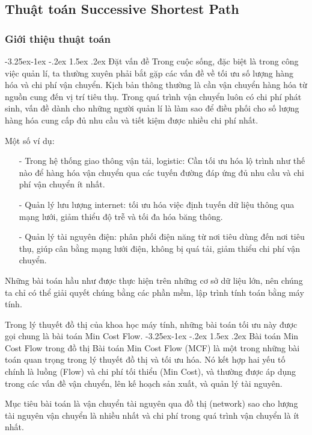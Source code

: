 \documentclass[a4paper]{article}
\makeatletter
\newcounter {subsubsubsection}[subsubsection]
\newcommand\subsubsubsection{\@startsection{subsubsubsection}{4}{\z@}%
                                     {-3.25ex\@plus -1ex \@minus -.2ex}%
                                     {1.5ex \@plus .2ex}%
                                     {\normalfont\normalsize\bfseries}}
\makeatother
\begin{document}
\subsection{Thuật toán Successive Shortest Path}
\subsubsection{Giới thiệu thuật toán}
\subsubsubsection{Đặt vấn đề}
{Trong cuộc sống, đặc biệt là trong công việc quản lí, ta thường xuyên phải bắt gặp các vấn đề về tối ưu số lượng hàng hóa và chi phí vận chuyển. Kịch bản thông thường là cần vận chuyển hàng hóa từ nguồn cung đến vị trí tiêu thụ. Trong quá trình vận chuyển luôn có chi phí phát sinh, vấn đề dành cho những người quản lí là làm sao để điều phối cho số lượng hàng hóa cung cấp đủ nhu cầu và tiết kiệm được nhiều chi phí nhất.}

{Một số ví dụ:}
\begin{enumerate}
    \item[-] {Trong hệ thống giao thông vận tải, logistic: Cần tối ưu hóa lộ trình như thế nào để hàng hóa vận chuyển qua các tuyến đường đáp ứng đủ nhu cầu và chi phí vận chuyển ít nhất.}
    \item[-] {Quản lý lưu lượng internet: tối ưu hóa việc định tuyến dữ liệu thông qua mạng lưới, giảm thiểu độ trễ và tối đa hóa băng thông.}
    \item[-] {Quản lý tài nguyên điện: phân phối điện năng từ nơi tiêu dùng đến nơi tiêu thụ, giúp cân bằng mạng lưới điện, không bị quá tải, giảm thiểu chi phí vận chuyển. }
\end{enumerate}

{Những bài toán hầu như được thực hiện trên những cơ sở dữ liệu lớn, nên chúng ta chỉ có thể giải quyết chúng bằng các phần mềm, lập trình tính toán bằng máy tính. }

{Trong lý thuyết đồ thị của khoa học máy tính, những bài toán tối ưu này được gọi chung là bài toán Min Cost Flow. }
\subsubsubsection{Bài toán Min Cost Flow trong đồ thị }
{Bài toán Min Cost Flow (MCF) là một trong những bài toán quan trọng trong lý thuyết đồ thị và tối ưu hóa. Nó kết hợp hai yếu tố chính là luồng (Flow) và chi phí tối thiểu (Min Cost), và thường được áp dụng trong các vấn đề vận chuyển, lên kế hoạch sản xuất, và quản lý tài nguyên.}

{Mục tiêu bài toán là vận chuyển tài nguyên qua đồ thị (network) sao cho lượng tài nguyên vận chuyển là nhiều nhất và chi phí trong quá trình vận chuyển là ít nhất. }
\end{document}
